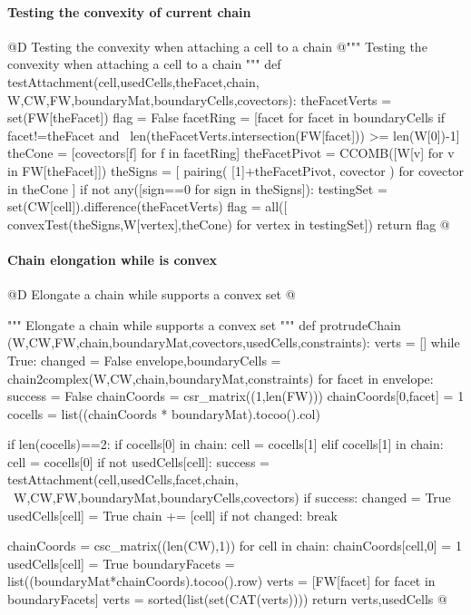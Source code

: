 \documentclass[11pt,oneside]{article}	%
\begin{document}
\paragraph{Testing the convexity of current chain}
@D Testing the convexity when attaching a cell to a chain
@{""" Testing the convexity when attaching a cell to a chain """
def testAttachment(cell,usedCells,theFacet,chain,
					W,CW,FW,boundaryMat,boundaryCells,covectors):
	theFacetVerts = set(FW[theFacet])
	flag = False
	facetRing = [facet for facet in boundaryCells if facet!=theFacet and \
				 len(theFacetVerts.intersection(FW[facet])) >= len(W[0])-1]
	theCone = [covectors[f] for f in facetRing]
	theFacetPivot = CCOMB([W[v] for v in FW[theFacet]])
	theSigns = [ pairing( [1]+theFacetPivot, covector ) for covector in theCone ]
	if not any([sign==0 for sign in theSigns]):
		testingSet = set(CW[cell]).difference(theFacetVerts)
		flag = all([ convexTest(theSigns,W[vertex],theCone) for vertex in testingSet])
	return flag
@}

\paragraph{Chain elongation while is convex}

@D Elongate a chain while supports a convex set
@{""" Elongate a chain while supports a convex set """
def protrudeChain (W,CW,FW,chain,boundaryMat,covectors,usedCells,constraints):
	verts = []
	while True:	
		changed = False
		envelope,boundaryCells = chain2complex(W,CW,chain,boundaryMat,constraints)
		for facet in envelope:
			success = False
			chainCoords = csr_matrix((1,len(FW)))
			chainCoords[0,facet] = 1
			cocells = list((chainCoords * boundaryMat).tocoo().col)
			
			if len(cocells)==2:
				if cocells[0] in chain: cell = cocells[1]
				elif cocells[1] in chain: cell = cocells[0]
				if not usedCells[cell]:
					success = testAttachment(cell,usedCells,facet,chain, \
								W,CW,FW,boundaryMat,boundaryCells,covectors)
				if success: 
					changed = True
					usedCells[cell] = True
					chain += [cell]
		if not changed: break		
			
	chainCoords = csc_matrix((len(CW),1))
	for cell in chain: 
		chainCoords[cell,0] = 1
		usedCells[cell] = True
	boundaryFacets = list((boundaryMat*chainCoords).tocoo().row)
	verts = [FW[facet] for facet in boundaryFacets]
	verts = sorted(list(set(CAT(verts))))
	return verts,usedCells
@}
\end{document}
